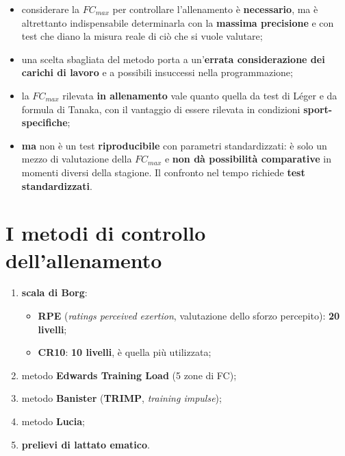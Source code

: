 \begin{itemize}
  \item considerare la $FC_{max}$ per controllare l'allenamento è \textbf{necessario}, ma è
    altrettanto indispensabile determinarla con la \textbf{massima precisione} e con test che diano
    la misura reale di ciò che si vuole valutare;
  \item una scelta sbagliata del metodo porta a un'\textbf{errata considerazione dei carichi di
    lavoro} e a possibili insuccessi nella programmazione;
  \item la $FC_{max}$ rilevata \textbf{in allenamento} vale quanto quella da test di Léger e da
    formula di Tanaka, con il vantaggio di essere rilevata in condizioni \textbf{sport-specifiche};
  \item \textbf{ma} non è un test \textbf{riproducibile} con parametri standardizzati: è solo un
    mezzo di valutazione della $FC_{max}$ e \textbf{non dà possibilità comparative} in momenti
    diversi della stagione. Il confronto nel tempo richiede \textbf{test standardizzati}.
\end{itemize}

\section{I metodi di controllo dell'allenamento}

\begin{enumerate}
  \item \textbf{scala di Borg}:
    \begin{itemize}
      \item \textbf{RPE} (\textit{ratings perceived exertion}, valutazione dello sforzo percepito):
        \textbf{20 livelli};
      \item \textbf{CR10}: \textbf{10 livelli}, è quella più utilizzata;
    \end{itemize}
  \item metodo \textbf{Edwards Training Load} (5 zone di FC);
  \item metodo \textbf{Banister} (\textbf{TRIMP}, \textit{training impulse});
  \item metodo \textbf{Lucia};
  \item \textbf{prelievi di lattato ematico}.
\end{enumerate}

